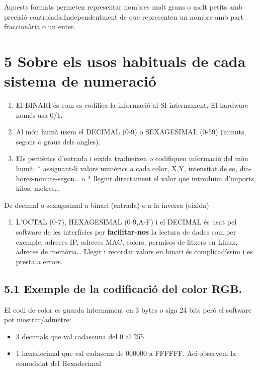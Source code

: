 \documentclass[
  12 pt,
  a4paper,
]{article}
\providecommand{\tightlist}{%
  \setlength{\itemsep}{0pt}\setlength{\parskip}{0pt}}
\begin{document}
Aquests formats permeten representar nombres molt grans o molt petits
amb precisió controlada.Independentment de que representen un nombre amb
part fraccionària o un enter.

\section{5 Sobre els usos habituals de cada sistema de
numeració}\label{sobre-els-usos-habituals-de-cada-sistema-de-numeraciuxf3}

\begin{enumerate}
\def\labelenumi{\arabic{enumi}.}
\item
  El BINARI és com es codifica la informació al SI internament. El
  hardware només usa 0/1.
\item
  Al món humà usem el DECIMAL (0-9) o SEXAGESIMAL (0-59) (minuts, segons
  o graus dels angles).
\item
  Els perifèrics d'entrada i eixida tradueixen o codifiquen informació
  del món humà: * assignant-li valors numèrics a cada color, X,Y,
  intensitat de so, dia-hores-minuts-segon\ldots{} o * llegint
  directament el valor que introduim d'imports, kilos, metres\ldots{}
\end{enumerate}

De decimal o sexagesimal a binari (entrada) o a la inversa (eixida)

\begin{enumerate}
\def\labelenumi{\arabic{enumi}.}
\setcounter{enumi}{3}
\tightlist
\item
  L'OCTAL (0-7), HEXAGESIMAL (0-9,A-F) i el DECIMAL és usat pel software
  de les interfícies per \textbf{facilitar-nos} la lectura de dades
  com,per exemple, adreces IP, adreces MAC, colors, permisos de fitxers
  en Linux, adreces de memòria\ldots{} Llegir i recordar valors en
  binari és complicadíssim i es presta a errors.
\end{enumerate}

\subsection{5.1 Exemple de la codificació del color
RGB.}\label{exemple-de-la-codificaciuxf3-del-color-rgb.}

El codi de color es guarda internament en 3 bytes o siga 24 bits però el
software pot mostrar/admetre:

\begin{itemize}
\tightlist
\item
  3 decimals que val cadascuna del 0 al 255.
\item
  1 hexadecimal que val cadascun de 000000 a FFFFFF. Ací observem la
  comodidat del Hexadecimal
\end{itemize}
\end{document}
